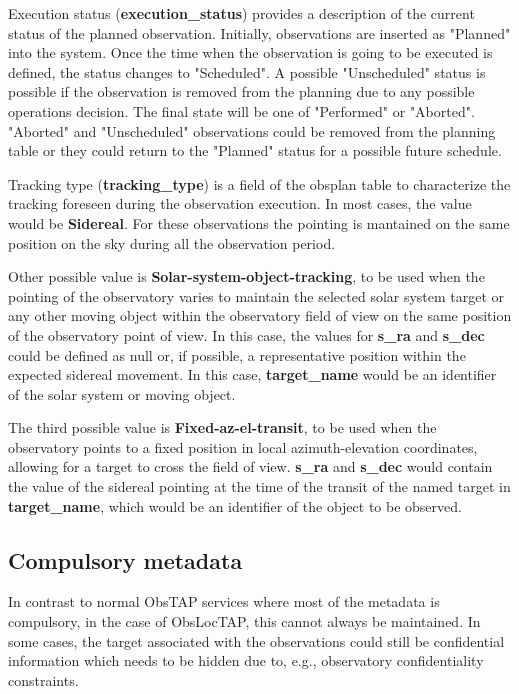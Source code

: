 \documentclass[11pt,a4paper]{ivoa}
\begin{document}
Execution status (\textbf{execution\_status}) provides a description of the
current status of the planned observation. Initially, observations are
inserted as "Planned" into the system. Once the time when the observation is
going to be executed is defined, the status changes to "Scheduled". A possible
"Unscheduled" status is possible if the observation is removed from the planning
due to any possible operations decision. The final state will be one of
"Performed" or "Aborted". "Aborted" and "Unscheduled" observations could be
removed from the planning table or they could return to the "Planned" status
for a possible future schedule.

Tracking type (\textbf{tracking\_type}) is a field of the obsplan table
to characterize the tracking foreseen during the observation execution.  
In most cases, the value would be \textbf{Sidereal}. For these observations the
pointing is mantained on the same position on the sky during all the observation
period.

Other possible value is \textbf{Solar-system-object-tracking}, to be used when
the pointing of the observatory varies to maintain the selected solar system
target or any other moving object within the observatory field of view on the
same position of the observatory point of view. In this case, the
values for \textbf{s\_ra} and \textbf{s\_dec} could be defined as null or,
if possible, a representative position within the expected sidereal movement.
In this case, \textbf{target\_name} would be an identifier of the solar system
or moving object.

The third possible value is \textbf{Fixed-az-el-transit}, to be used when the
observatory points to a fixed position in local azimuth-elevation coordinates,
allowing for a target to cross the field of view. \textbf{s\_ra} and 
\textbf{s\_dec} would contain the value of the sidereal pointing at the time
of the transit of the named target in \textbf{target\_name}, which would be
an identifier of the object to be observed.



\subsection{Compulsory metadata}
In contrast to normal ObsTAP services where most of the metadata is compulsory,
in the case of ObsLocTAP, this cannot always be maintained. In some cases, the
target associated with the observations could still be confidential information
which needs to be hidden due to, e.g., observatory confidentiality constraints.
\end{document}
